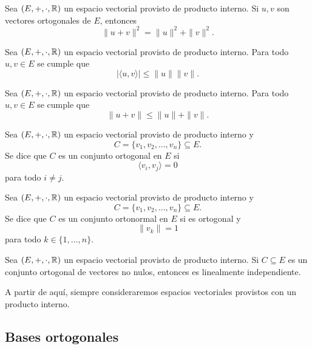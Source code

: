 \documentclass[a4,11pt]{aleph-notas}
\begin{document}
\begin{teo}
    Sea $(E,+,\cdot,\mathbb{R})$ un espacio vectorial provisto de producto interno.
    Si $u,v$ son vectores ortogonales de $E$, entonces
    \[
        \| u + v \|^2 = \|u\|^2 + \|v\|^2.
    \]
\end{teo}

\begin{teo}
    Sea $(E,+,\cdot,\mathbb{R})$ un espacio vectorial provisto de producto interno.
    Para todo $u,v\in E$ se cumple que
    \[
        | \langle u , v \rangle | \leq \|u\|  \|v\|.
    \]
\end{teo}

\begin{teo}
    Sea $(E,+,\cdot,\mathbb{R})$ un espacio vectorial provisto de producto interno.
    Para todo $u,v\in E$ se cumple que
    \[
        \| u + v \| \leq \|u\| + \|v\|.
    \]
\end{teo}


\begin{defi}
    Sea $(E,+,\cdot,\mathbb{R})$ un espacio vectorial provisto de producto interno y
    \[C=\{v_1, v_2, \ldots, v_n\}\subseteq E.\] Se dice que $C$ es un conjunto ortogonal en $E$ si
    \[
        \langle v_i, v_j \rangle = 0
    \]
    para todo $i \neq j$.
\end{defi}

\begin{defi}
    Sea $(E,+,\cdot,\mathbb{R})$ un espacio vectorial provisto de producto interno y
    \[C = \{v_1, v_2, \ldots, v_n\} \subseteq E.\] Se dice que $C$ es un conjunto ortonormal en $E$ si es ortogonal y 
    \[
        \| v_k\| =  1
    \]
    para todo $k \in \{1, \ldots, n\}$.
\end{defi}


\begin{teo}
    Sea $(E,+,\cdot,\mathbb{R})$ un espacio vectorial provisto de producto interno. Si $C \subseteq E$ es un conjunto ortogonal de vectores no nulos, entonces es linealmente independiente.
\end{teo}


A partir de aquí, siempre consideraremos espacios vectoriales provistos con un producto interno.


\subsection{Bases ortogonales}
\end{document}
